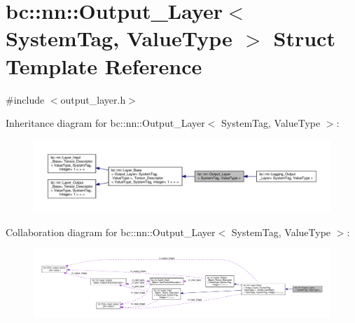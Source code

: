 \hypertarget{structbc_1_1nn_1_1Output__Layer}{}\section{bc\+:\+:nn\+:\+:Output\+\_\+\+Layer$<$ System\+Tag, Value\+Type $>$ Struct Template Reference}
\label{structbc_1_1nn_1_1Output__Layer}


{\ttfamily \#include $<$output\+\_\+layer.\+h$>$}



Inheritance diagram for bc\+:\+:nn\+:\+:Output\+\_\+\+Layer$<$ System\+Tag, Value\+Type $>$\+:\nopagebreak
\begin{figure}[H]
\begin{center}
\leavevmode
\includegraphics[width=350pt]{structbc_1_1nn_1_1Output__Layer__inherit__graph}
\end{center}
\end{figure}


Collaboration diagram for bc\+:\+:nn\+:\+:Output\+\_\+\+Layer$<$ System\+Tag, Value\+Type $>$\+:\nopagebreak
\begin{figure}[H]
\begin{center}
\leavevmode
\includegraphics[width=350pt]{structbc_1_1nn_1_1Output__Layer__coll__graph}
\end{center}
\end{figure}
